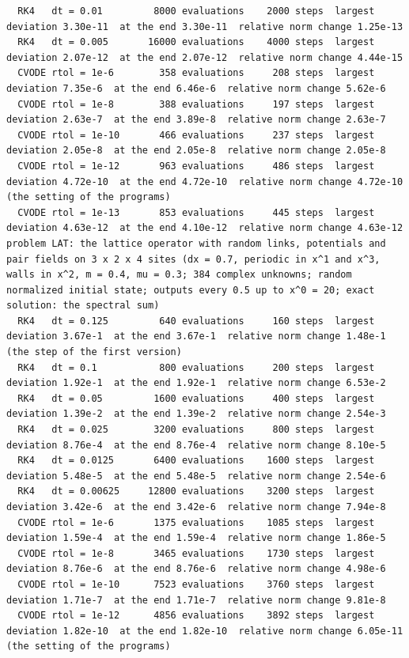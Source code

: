 \documentclass[
  10pt,
]{article}
\begin{document}
\begin{verbatim}
  RK4   dt = 0.01         8000 evaluations    2000 steps  largest deviation 3.30e-11  at the end 3.30e-11  relative norm change 1.25e-13
  RK4   dt = 0.005       16000 evaluations    4000 steps  largest deviation 2.07e-12  at the end 2.07e-12  relative norm change 4.44e-15
  CVODE rtol = 1e-6        358 evaluations     208 steps  largest deviation 7.35e-6  at the end 6.46e-6  relative norm change 5.62e-6
  CVODE rtol = 1e-8        388 evaluations     197 steps  largest deviation 2.63e-7  at the end 3.89e-8  relative norm change 2.63e-7
  CVODE rtol = 1e-10       466 evaluations     237 steps  largest deviation 2.05e-8  at the end 2.05e-8  relative norm change 2.05e-8
  CVODE rtol = 1e-12       963 evaluations     486 steps  largest deviation 4.72e-10  at the end 4.72e-10  relative norm change 4.72e-10  (the setting of the programs)
  CVODE rtol = 1e-13       853 evaluations     445 steps  largest deviation 4.63e-12  at the end 4.10e-12  relative norm change 4.63e-12
problem LAT: the lattice operator with random links, potentials and pair fields on 3 x 2 x 4 sites (dx = 0.7, periodic in x^1 and x^3, walls in x^2, m = 0.4, mu = 0.3; 384 complex unknowns; random normalized initial state; outputs every 0.5 up to x^0 = 20; exact solution: the spectral sum)
  RK4   dt = 0.125         640 evaluations     160 steps  largest deviation 3.67e-1  at the end 3.67e-1  relative norm change 1.48e-1  (the step of the first version)
  RK4   dt = 0.1           800 evaluations     200 steps  largest deviation 1.92e-1  at the end 1.92e-1  relative norm change 6.53e-2
  RK4   dt = 0.05         1600 evaluations     400 steps  largest deviation 1.39e-2  at the end 1.39e-2  relative norm change 2.54e-3
  RK4   dt = 0.025        3200 evaluations     800 steps  largest deviation 8.76e-4  at the end 8.76e-4  relative norm change 8.10e-5
  RK4   dt = 0.0125       6400 evaluations    1600 steps  largest deviation 5.48e-5  at the end 5.48e-5  relative norm change 2.54e-6
  RK4   dt = 0.00625     12800 evaluations    3200 steps  largest deviation 3.42e-6  at the end 3.42e-6  relative norm change 7.94e-8
  CVODE rtol = 1e-6       1375 evaluations    1085 steps  largest deviation 1.59e-4  at the end 1.59e-4  relative norm change 1.86e-5
  CVODE rtol = 1e-8       3465 evaluations    1730 steps  largest deviation 8.76e-6  at the end 8.76e-6  relative norm change 4.98e-6
  CVODE rtol = 1e-10      7523 evaluations    3760 steps  largest deviation 1.71e-7  at the end 1.71e-7  relative norm change 9.81e-8
  CVODE rtol = 1e-12      4856 evaluations    3892 steps  largest deviation 1.82e-10  at the end 1.82e-10  relative norm change 6.05e-11  (the setting of the programs)

\end{verbatim}
\end{document}
